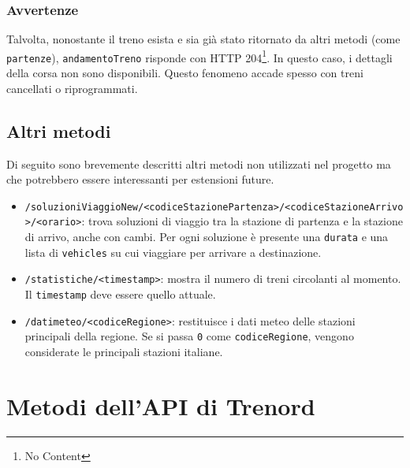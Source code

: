 \documentclass[12pt,italian]{report}
\begin{document}
\subsubsection{Avvertenze}

Talvolta, nonostante il treno esista e sia già stato ritornato da
altri metodi (come \texttt{partenze}), \texttt{andamentoTreno}
risponde con HTTP 204\footnote{No Content}.  In questo caso, i
dettagli della corsa non sono disponibili.  Questo fenomeno accade
spesso con treni cancellati o riprogrammati.  

\subsection{Altri metodi}

Di seguito sono brevemente descritti altri metodi non utilizzati nel
progetto ma che potrebbero essere interessanti per estensioni future.

\begin{itemize}
    \item
    \texttt{/soluzioniViaggioNew/\-<codiceStazionePartenza>/\-<codiceStazioneArrivo>/\-<orario>}:
    trova soluzioni di viaggio tra la stazione di partenza e la
    stazione di arrivo, anche con cambi.  Per ogni soluzione è
    presente una \texttt{durata} e una lista di \texttt{vehicles} su
    cui viaggiare per arrivare a destinazione.
    \item \texttt{/statistiche/<timestamp>}: mostra il numero di treni
    circolanti al momento. Il \texttt{timestamp} deve essere quello
    attuale.
    \item \texttt{/datimeteo/\-<codiceRegione>}: restituisce i dati
    meteo delle stazioni principali della regione. Se si passa
    \texttt{0} come \texttt{codiceRegione}, vengono considerate le
    principali stazioni italiane.
\end{itemize}

\section{Metodi dell'API di Trenord}
\end{document}
